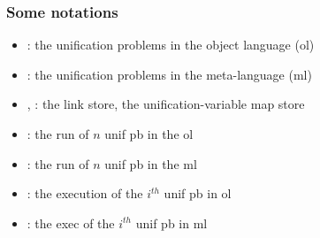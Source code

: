 \documentclass{pres}
\newcommand{\sepFrame}[1]{
  \section{#1}
  \begin{frame}
    \centering
    {\usebeamerfont*{frametitle}\usebeamercolor[fg]{frametitle} #1}
  \end{frame}
}
\begin{document}


\def\llam{\ensuremath{{\mathcal{L}_\lambda}}\xspace}
\begin{frame}
  \frametitle{Some notations}

  \begin{itemize}
    \item \foUnifPb: the unification problems in the object language (ol)
    \item \hoUnifPb: the unification problems in the meta-language (ml)
    \item \linkStore, \mapStore: the link store, the unification-variable map store
  \end{itemize}

  \mysep

  \begin{itemize}
    \item {}: the run of $n$ unif pb in the ol
    \item {}: the run of $n$ unif pb in the ml
    \item {}: the execution of the $i^{th}$ unif pb in ol
    \item {}: the exec of the $i^{th}$ unif pb in ml
  \end{itemize}


\end{frame}
\end{document}
